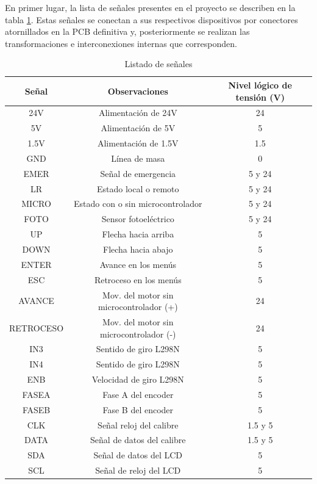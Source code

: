 En primer lugar, la lista de señales presentes en el proyecto se describen en la tabla \ref{tab:tab2}.
Estas señales se conectan a sus respectivos dispositivos por conectores atornillados en la PCB definitiva
y, posteriormente se realizan las transformaciones e interconexiones internas que corresponden.

\begin{table}[hbtp]
    \begin{center}
    \begin{tabular}{ | c | c | c | }
    \hline
    Señal & Observaciones & Nivel lógico de tensión (V)\\ \hline
    24V & Alimentación de 24V & 24\\
    5V & Alimentación de 5V &5\\
    1.5V & Alimentación de 1.5V& 1.5\\
    GND & Línea de masa &0\\
    EMER & Señal de emergencia & 5 y 24 \\
    LR &  Estado local o remoto & 5 y 24  \\
    MICRO &  Estado con o sin microcontrolador & 5 y 24 \\
    FOTO & Sensor fotoeléctrico &5 y 24\\
    UP & Flecha hacia arriba &5\\
    DOWN & Flecha hacia abajo &5\\    
    ENTER & Avance en los menús &5\\
    ESC & Retroceso en los menús &5\\
    AVANCE & Mov. del motor sin microcontrolador (+) &24\\
    RETROCESO & Mov. del motor sin microcontrolador (-) & 24\\
    IN3 & Sentido de giro L298N &5\\
    IN4 & Sentido de giro L298N &5\\
    ENB & Velocidad de giro L298N &5\\
    FASEA & Fase A del encoder &5\\
    FASEB & Fase B del encoder &5\\
    CLK & Señal reloj del calibre &1.5 y 5\\
    DATA & Señal de datos del calibre &1.5 y 5\\
    SDA & Señal de datos del LCD &5\\
    SCL & Señal de reloj del LCD &5\\
    
    \hline

    \end{tabular}
    \end{center}
    \caption{Listado de señales}
    \label{tab:tab2}
\end{table}

